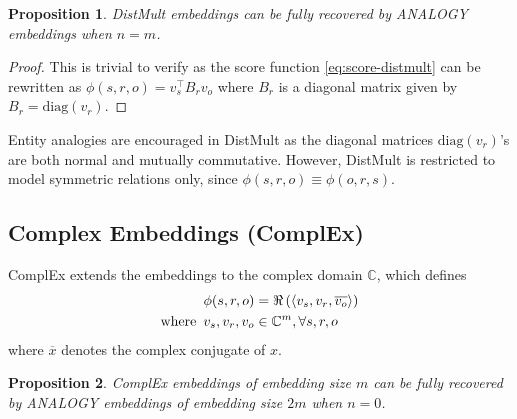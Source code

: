 \documentclass{article}
\newtheorem{proposition}{Proposition}[section]
\begin{document}
\begin{proposition}
    DistMult embeddings can be fully recovered by ANALOGY embeddings when $n = m$.
\end{proposition}
\begin{proof}
    This is trivial to verify as the score function \eqref{eq:score-distmult} can be rewritten as $\phi(s, r, o) = v_s^\top B_r v_o$
    where $B_r$ is a diagonal matrix given by $B_r = \mathrm{diag}(v_r)$.
\end{proof}
Entity analogies are encouraged in DistMult as the diagonal matrices $\mathrm{diag}(v_r)$'s are both normal and mutually commutative.
However, DistMult is restricted to model symmetric relations only, since $\phi(s, r, o) \equiv \phi(o, r, s)$.

\subsection{Complex Embeddings (ComplEx)}
ComplEx \cite{DBLP:conf/icml/TrouillonWRGB16} extends the embeddings to the complex domain $\mathbb{C}$,
which defines
\begin{align}
    \phi(s, r, o) &= \Re\left( \langle v_s, v_r, \overline{v_o} \rangle \right) \label{eq:complex} \\
    \text{where} \enskip v_s, v_r, v_o &\in \mathbb{C}^m, \forall s, r, o
\end{align}
where $\overline{x}$ denotes the complex conjugate of $x$.

\begin{proposition}
    ComplEx embeddings of embedding size $m$ can be fully recovered by ANALOGY embeddings
    of embedding size $2m$ when $n = 0$.
\end{proposition}
\end{document}
